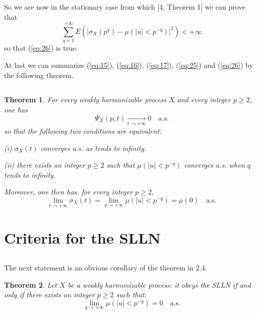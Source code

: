 \documentclass{article}
\newtheorem{theorem}{Theorem}
\theoremstyle{definition}
\begin{document}
So we are now in the stationary case from which [4, Theorem 1] we can prove that
\begin{equation}\label{eq:29}
\sum_{q=1}^{+\infty} E\left(\left|\sigma_{X}\left(p^{q}\right)-\mu\left(|u|<p^{-q}\right)\right|^{2}\right)<+\infty
\end{equation}
so that (\ref{eq:26}) is true.

At last we can summarize (\ref{eq:15}), (\ref{eq:16}), (\ref{eq:17}), (\ref{eq:25}) and (\ref{eq:26}) by the following theorem.

\subsection{}

\begin{theorem}\label{thm:1}
For every weakly harmonizable process $X$ and every integer $p \geqslant 2$, one has
\begin{equation}\label{eq:30}
\Psi_{X}(p, t) \underset{t \rightarrow+\infty}{\longrightarrow} 0 \quad \text{a.s.}
\end{equation}
so that the following two conditions are equivalent:

(i) $\sigma_{X}(t)$ converges a.s. as tends to infinity.

(ii) there exists an integer $p \geqslant 2$ such that $\mu\left(|u|<p^{-q}\right)$ converges a.s. when $q$ tends to infinity.

Moreover, one then has, for every integer $p \geqslant 2$,
\begin{equation}\label{eq:31}
\lim_{t \rightarrow+\infty} \sigma_{X}(t)=\lim_{q \rightarrow+\infty} \mu\left(|u|<p^{-q}\right)=\mu(0) \quad \text{a.s.}
\end{equation}
\end{theorem}

\section{Criteria for the SLLN}
\subsection{}

The next statement is an obvious corollary of the theorem in 2.4.

\begin{theorem}\label{thm:2}
Let $X$ be a weakly harmonizable process: it obeys the SLLN if and only if there exists an integer $p \geqslant 2$ such that:
\begin{equation}\label{eq:32}
\lim_{q \rightarrow+\infty} \mu\left(|u|<p^{-q}\right)=0 \quad \text{a.s.}
\end{equation}
\end{theorem}
\end{document}
